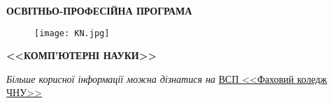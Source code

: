         \begin{titlepage}
            \centering

            \vspace*{40mm} %
            \textbf{\Huge {ОСВІТНЬО-ПРОФЕСІЙНА ПРОГРАМА}}

            \vspace{0mm}
            \begin{figure}[!h]
                \centering
                \texttt{[image: KN.jpg]}
            \end{figure}

            \vspace{0mm}
            \Large \textbf{{<<КОМП'ЮТЕРНІ НАУКИ>>}}


            \vspace*{0mm}


            \vfill
            \small \textit{Більше корисної інформації можна дізнатися на }{\href{http://college.chnu.edu.ua/}{ВСП <<Фаховий коледж ЧНУ>>}}
        \end{titlepage}



